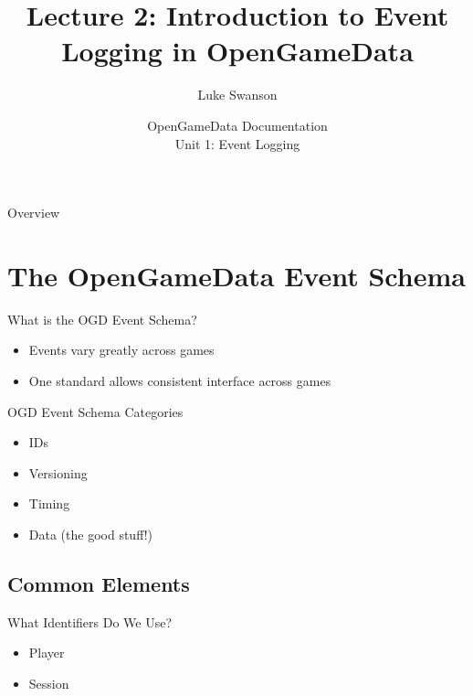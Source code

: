 \documentclass{beamer}
\title[Intro to Events] %
{Lecture 2: Introduction to Event Logging in OpenGameData}
\author[Swanson] %
{Luke Swanson}
\institute[University of Wisconsin-Madison] %
{
  Field Day Lab\\
  University of Wisconsin-Madison
}
\date[OGD Docs] %
{OpenGameData Documentation \\ Unit 1: Event Logging}
\begin{document}
\begin{frame}
  \titlepage
\end{frame}

\begin{frame}{Overview}
  \tableofcontents
\end{frame}




\section[Event Schema]{The OpenGameData Event Schema}

\begin{frame}{What is the OGD Event Schema?}
  \begin{itemize}
  \item Events vary greatly across games
  \item One standard allows consistent interface across games
  \end{itemize}
\end{frame}

\begin{frame}{OGD Event Schema Categories}
  \begin{itemize}
  \item IDs
  \item Versioning
  \item Timing
  \item Data (the good stuff!)
  \end{itemize}
\end{frame}

\subsection[IDs]{Common Elements}

\begin{frame}{What Identifiers Do We Use?}
  \begin{itemize}
  \item Player
  \item Session
  \end{itemize}
\end{frame}
\end{document}
